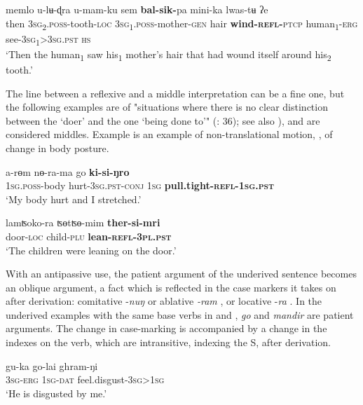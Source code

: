 \documentclass[output=paper]{langscibook}
\begin{document}
\ea%
    \label{ex:Lahaussois:14}
    \gll memlo u-lʉ-ɖra u-mam-ku sem \textbf{bal-sik-}pa mini-ka lwas-tʉ ʔe\\
        then \textsc{3sg}\textsc{\textsubscript{2}}\textsc{.poss}{}-tooth-\textsc{loc} \textsc{3sg}\textsc{\textsubscript{1}}\textsc{.poss}{}-mother-\textsc{gen} hair \textbf{wind-\textsc{refl-}}\textsc{ptcp}   human\textsubscript{1}{}-\textsc{erg}   see-\textsc{3sg}\textsc{\textsubscript{1}}\textsc{>3sg.pst} \textsc{hs}\\
    \glt ‘Then the human\textsubscript{1} saw his\textsubscript{1} mother's hair that had wound itself around his\textsubscript{2} tooth.'
    \z

The line between a reflexive and a middle interpretation can be a fine one, but the following examples are of "situations where there is no clear distinction between the ‘doer' and the one ‘being done to'" (\citealt{LaPolla2003}: 36); see also \citealt[Chapter3]{Kemmer1993}), and are considered middles. Example  is an example of non-translational motion, , of change in body posture.

\ea%
    \label{ex:Lahaussois:15}
    \gll a-rɵm nɵ-ra-ma go \textbf{ki-si-ŋro}\\
        \textsc{1sg.poss}{}-body hurt-\textsc{3sg.pst-conj} \textsc{1sg} \textbf{pull.tight-\textsc{refl-1sg.pst}}\\
    \glt ‘My body hurt and I stretched.'
    \z

\ea%
    \label{ex:Lahaussois:16}
    \gll lamʦoko-ra ʦɵtʦɵ-mim \textbf{ther-si-mri}\\
        door-\textsc{loc} child-\textsc{plu} \textbf{lean-\textsc{refl-3pl.pst}}\\
    \glt ‘The children were leaning on the door.'
    \z

With an antipassive use, the patient argument of the underived sentence becomes an oblique argument, a fact which is reflected in the case markers it takes on after derivation: comitative -\textit{nuŋ} or ablative \textit{{}-ram} , or locative -\textit{ra} . In the underived examples with the same base verbs in  and , \textit{go} and \textit{mandir} are patient arguments.  The change in case-marking is accompanied by a change in the indexes on the verb, which are intransitive, indexing the S, after derivation.

\ea%
    \label{ex:Lahaussois:17}
    \ea
    \label{ex:Lahaussois:17a}
    \gll gu-ka go-lai ghram-ŋi\\
        \textsc{3sg-erg} \textsc{1sg-dat} feel.disgust-\textsc{3sg>1sg}\\
    \glt ‘He is disgusted by me.'
    
\end{document}

